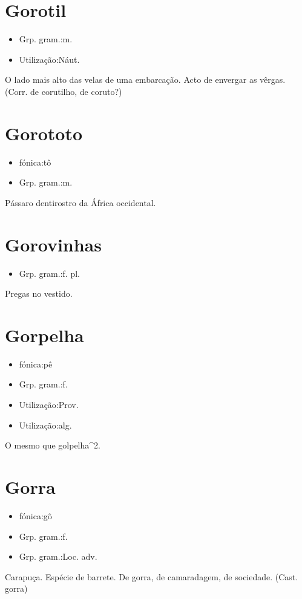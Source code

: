 \section{Gorotil}
\begin{itemize}
\item {Grp. gram.:m.}
\end{itemize}
\begin{itemize}
\item {Utilização:Náut.}
\end{itemize}
O lado mais alto das velas de uma embarcação.
Acto de envergar as vêrgas.
(Corr. de \textunderscore corutilho\textunderscore , de \textunderscore coruto\textunderscore ?)
\section{Gorototo}
\begin{itemize}
\item {fónica:tô}
\end{itemize}
\begin{itemize}
\item {Grp. gram.:m.}
\end{itemize}
Pássaro dentirostro da África occidental.
\section{Gorovinhas}
\begin{itemize}
\item {Grp. gram.:f. pl.}
\end{itemize}
Pregas no vestido.
\section{Gorpelha}
\begin{itemize}
\item {fónica:pê}
\end{itemize}
\begin{itemize}
\item {Grp. gram.:f.}
\end{itemize}
\begin{itemize}
\item {Utilização:Prov.}
\end{itemize}
\begin{itemize}
\item {Utilização:alg.}
\end{itemize}
O mesmo que \textunderscore golpelha\textunderscore ^2.
\section{Gorra}
\begin{itemize}
\item {fónica:gô}
\end{itemize}
\begin{itemize}
\item {Grp. gram.:f.}
\end{itemize}
\begin{itemize}
\item {Grp. gram.:Loc. adv.}
\end{itemize}
Carapuça.
Espécie de barrete.
De gorra, de camaradagem, de sociedade.
(Cast. \textunderscore gorra\textunderscore )
